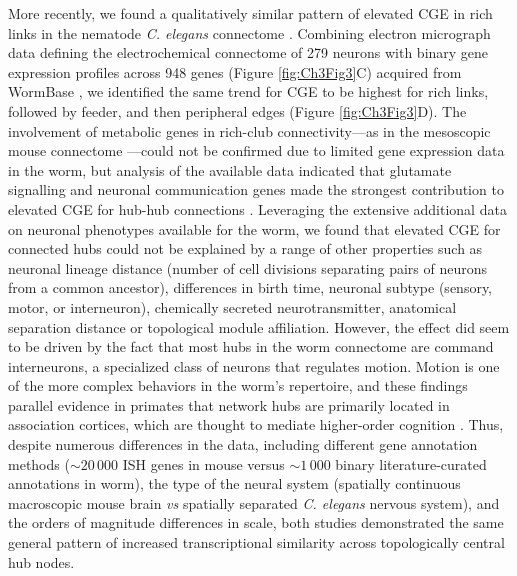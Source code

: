 More recently, we found a qualitatively similar pattern of elevated CGE in rich links in the nematode \textit{C. elegans} connectome \citep{Arnatkeviciute2018}. 
Combining electron micrograph data defining the electrochemical connectome of 279 neurons \citep{Varshney2011} with binary gene expression profiles across 948 genes (Figure \ref{fig:Ch3Fig3}C) acquired from WormBase \citep{Harris2010}, we identified the same trend for CGE to be highest for rich links, followed by feeder, and then peripheral edges (Figure \ref{fig:Ch3Fig3}D). 
The involvement of metabolic genes in rich-club connectivity---as in the mesoscopic mouse connectome \citep{Fulcher2016}---could not be confirmed due to limited gene expression data in the worm, but analysis of the available data indicated that glutamate signalling and neuronal communication genes made the strongest contribution to elevated CGE for hub-hub connections \citep{Arnatkeviciute2018}. 
Leveraging the extensive additional data on neuronal phenotypes available for the worm, we found that elevated CGE for connected hubs could not be explained by a range of other properties such as neuronal lineage distance (number of cell divisions separating pairs of neurons from a common ancestor), differences in birth time, neuronal subtype (sensory, motor, or interneuron), chemically secreted neurotransmitter, anatomical separation distance or topological module affiliation. However, the effect did seem to be driven by the fact that most hubs in the worm connectome are command interneurons, a specialized class of neurons that regulates motion. Motion is one of the more complex behaviors in the worm’s repertoire, and these findings parallel evidence in primates that network hubs are primarily located in association cortices, which are thought to mediate higher-order cognition \citep{Achard2006,Sporns2007}. 
Thus, despite numerous differences in the data, including different gene annotation methods ($\sim20\,000$ ISH genes in mouse versus $\sim1\,000$ binary literature-curated annotations in worm), the type of the neural system (spatially continuous macroscopic mouse brain \textit{vs} spatially separated \textit{C. elegans} nervous system), and the orders of magnitude differences in scale, both studies demonstrated the same general pattern of increased transcriptional similarity across topologically central hub nodes.

